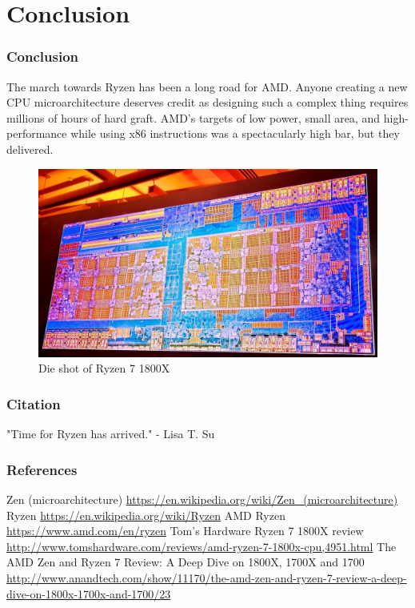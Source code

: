 \documentclass{beamer}
\begin{document}
	\section{Conclusion}
	\begin{frame}
		\frametitle{Conclusion}
		\begin{center}
		The march towards Ryzen has been a long road for AMD. Anyone creating a new CPU
		microarchitecture deserves credit as designing such a complex thing requires millions 
		of hours of hard graft. AMD’s targets of low power, small area, and high-performance 
		while using x86 instructions was a spectacularly high bar, but they delivered. 
		\end{center}
		\begin{figure}[p]
			\includegraphics[width=.5\textwidth]{die.jpg}
			\caption{Die shot of Ryzen 7 1800X}
		\end{figure}
	\end{frame}	
	\begin{frame}
		\frametitle{Citation}
		\begin{center}
			"Time for Ryzen has arrived." - Lisa T. Su
		\end{center}
	\end{frame}
	\begin{frame}
		\frametitle{References}
		\footnotesize{
			\begin{thebibliography}{99}	
				 Zen (microarchitecture)
				\newblock \url{https://en.wikipedia.org/wiki/Zen_(microarchitecture)}
				 Ryzen
				\newblock \url{https://en.wikipedia.org/wiki/Ryzen}
				 AMD Ryzen
				\newblock \url{https://www.amd.com/en/ryzen}
				 Tom's Hardware Ryzen 7 1800X review
				\newblock \url{http://www.tomshardware.com/reviews/amd-ryzen-7-1800x-cpu,4951.html}
				 The AMD Zen and Ryzen 7 Review: A Deep Dive on 1800X, 1700X and 1700
				\newblock \url{http://www.anandtech.com/show/11170/the-amd-zen-and-ryzen-7-review-a-deep-dive-on-1800x-1700x-and-1700/23}
			\end{thebibliography}
		}
	\end{frame}
\end{document}
